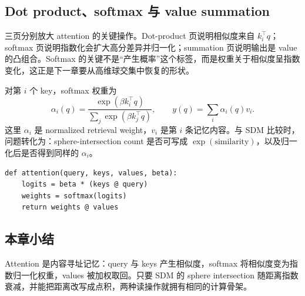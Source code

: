 

\subsection{Dot product、softmax 与 value summation}

三页分别放大 attention 的关键操作。Dot-product 页说明相似度来自 $k_i^{\top}q$；softmax 页说明指数化会扩大高分差异并归一化；summation 页说明输出是 value 的凸组合。Softmax 的关键不是“产生概率”这个标签，而是权重关于相似度呈指数变化，这正是下一章要从高维球交集中恢复的形状。





对第 $i$ 个 key，softmax 权重为
$$
\alpha_i(q)=\frac{\exp(\beta k_i^{\top}q)}
{\sum_j\exp(\beta k_j^{\top}q)},
\qquad
y(q)=\sum_i\alpha_i(q)v_i.
$$
这里 $\alpha_i$ 是 normalized retrieval weight，$v_i$ 是第 $i$ 条记忆内容。与 SDM 比较时，问题转化为：sphere-intersection count 是否可写成 $\exp(\text{similarity})$，以及归一化后是否得到同样的 $\alpha_i$。

\begin{lstlisting}[caption={Scaled dot-product attention（单 query 示意）}]
def attention(query, keys, values, beta):
    logits = beta * (keys @ query)
    weights = softmax(logits)
    return weights @ values
\end{lstlisting}


\subsection{本章小结}

Attention 是内容寻址记忆：query 与 keys 产生相似度，softmax 将相似度变为指数归一化权重，values 被加权取回。只要 SDM 的 sphere intersection 随距离指数衰减，并能把距离改写成点积，两种读操作就拥有相同的计算骨架。

